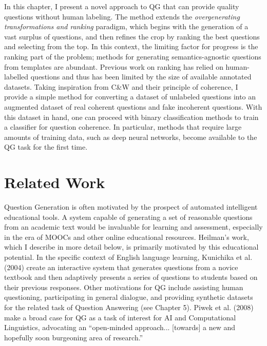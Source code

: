 In this chapter, I present a novel approach to QG that can provide quality questions without human labeling. The method extends the \textit{overgenerating transformations and ranking} paradigm, which begins with the generation of a vast surplus of questions, and then refines the crop by ranking the best questions and selecting from the top. In this context, the limiting factor for progress is the ranking part of the problem; methods for generating semantics-agnostic questions from templates are abundant. Previous work on ranking has relied on human-labelled questions and thus has been limited by the size of available annotated datasets. Taking inspiration from C\&W and their principle of coherence, I provide a simple method for converting a dataset of unlabeled questions into an augmented dataset of real coherent questions and fake incoherent questions. With this dataset in hand, one can proceed with binary classification methods to train a classifier for question coherence. In particular, methods that require large amounts of training data, such as deep neural networks, become available to the QG task for the first time. 

\section{Related Work}

Question Generation is often motivated by the prospect of automated intelligent educational tools. A system capable of generating a set of reasonable questions from an academic text would be invaluable for learning and assessment, especially in the era of MOOCs and other online educational resources. Heilman's work, which I describe in more detail below, is primarily motivated by this educational potential. In the specific context of English language learning, Kunichika et al. (2004) create an interactive system that generates questions from a novice textbook and then adaptively presents a series of questions to students based on their previous responses. Other motivations for QG include assisting human questioning, participating in general dialogue, and providing synthetic datasets for the related task of Question Answering (see Chapter 5). Piwek et al. (2008) make a broad case for QG as a task of interest for AI and Computational Linguistics, advocating an ``open-minded approach... [towards] a new and hopefully soon burgeoning area of research.''

